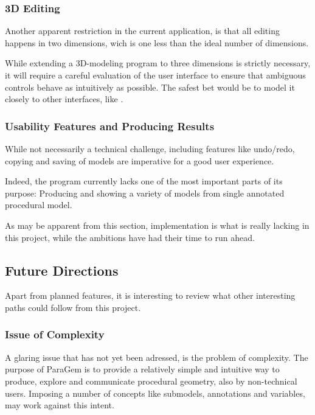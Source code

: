 \documentclass[english]{article}
\begin{document}

\subsubsection{3D Editing}

Another apparent restriction in the current application, is that all editing happens in two dimensions, wich is one less than the ideal number of dimensions.

While extending a 3D-modeling program to three dimensions is strictly necessary, it will require a careful evaluation of the user interface to ensure that ambiguous controls behave as intuitively as possible. The safest bet would be to model it closely to other interfaces, like \cite{gingold09}.


\subsubsection{Usability Features and Producing Results}

While not necessarily a technical challenge, including features like undo/redo, copying and saving of models are imperative for a good user experience.

Indeed, the program currently lacks one of the most important parts of its purpose: Producing and showing a variety of models from single annotated procedural model.

As may be apparent from this section, implementation is what is really lacking in this project, while the ambitions have had their time to run ahead. 

\subsection{Future Directions}

Apart from planned features, it is interesting to review what other interesting paths could follow from this project.

\subsubsection{Issue of Complexity}

A glaring issue that has not yet been adressed, is the problem of complexity. The purpose of ParaGem is to provide a relatively simple and intuitive way to produce, explore and communicate procedural geometry, also by non-technical users. Imposing a number of concepts like submodels, annotations and variables, may work against this intent.
\end{document}
